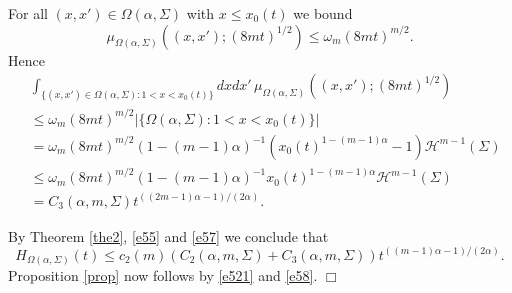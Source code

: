 \documentclass[a4paper,9pt]{amsart}
\begin{document}
For all $(x,x')\in \Omega(\alpha,\Sigma)$ with $x\le x_0(t)$ we
bound
\begin{equation*}
\mu_{\Omega(\alpha,\Sigma)}((x,x');(8mt)^{1/2})\le
\omega_m(8mt)^{m/2}.
\end{equation*}
Hence
\begin{align}\label{e57}
&\int_{\{(x,x')\in \Omega(\alpha,\Sigma):1<x<x_0(t)\}}dxdx' \,
\mu_{\Omega(\alpha,\Sigma)}((x,x');(8mt)^{1/2})\nonumber
\\ &
\le\omega_m(8mt)^{m/2}|\{\Omega(\alpha,\Sigma):1<x<x_0(t)\}|\nonumber
\\ &
=\omega_m(8mt)^{m/2}(1-(m-1)\alpha)^{-1}\left(x_0(t)^{1-(m-1)\alpha}-1\right)\mathcal{H}^{m-1}(\Sigma)\nonumber
\\
&\le\omega_m(8
mt)^{m/2}(1-(m-1)\alpha)^{-1}x_0(t)^{1-(m-1)\alpha}\mathcal{H}^{m-1}(\Sigma)\nonumber
\\ &=C_3(\alpha,m,\Sigma) t^{((2m-1)\alpha-1)/(2\alpha)}.
\end{align}

By Theorem \ref{the2}, \eqref{e55} and \eqref{e57} we conclude
that
\begin{equation}\label{e58}
H_{\Omega(\alpha,\Sigma)}(t)\le
c_2(m)\left(C_2(\alpha,m,\Sigma)+C_3(\alpha,m,\Sigma)\right)t^{((m-1)\alpha-1)/(2\alpha)}.
\end{equation}
Proposition \ref{prop} now follows by \eqref{e521} and
\eqref{e58}. \hspace{62mm}$\Box$
\end{document}
